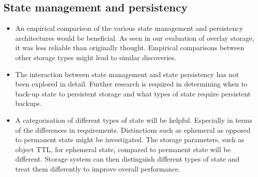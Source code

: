 \subsection{State management and persistency}

\begin{itemize}
\item An empirical comparison of the various state management and persistency architectures would be beneficial. As seen in our evaluation of overlay storage, it was less reliable than originally thought. Empirical comparisons between other storage types might lead to similar discoveries.

\item The interaction between state management and state persistency has not been explored in detail. Further research is required in determining when to back-up state to persistent storage and what types of state require persistent backups.

\item A categorisation of different types of state will be helpful. Especially in terms of the differences in requirements. Distinctions such as ephemeral as opposed to permanent state might be investigated. The storage parameters, such as object TTL, for ephemeral state, compared to permanent state will be different. Storage system can then distinguish different types of state and treat them differently to improve overall performance.
\end{itemize}


